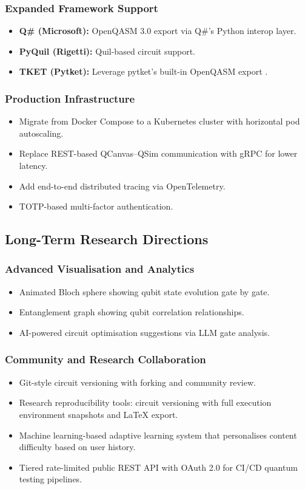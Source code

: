 \subsubsection{Expanded Framework Support}
\begin{itemize}
    \item \textbf{Q\# (Microsoft):} OpenQASM 3.0 export via Q\#'s Python interop layer.
    \item \textbf{PyQuil (Rigetti):} Quil-based circuit support.
    \item \textbf{TKET (Pytket):} Leverage pytket's built-in OpenQASM export \cite{sivarajah2020tket}.
\end{itemize}

\subsubsection{Production Infrastructure}
\begin{itemize}
    \item Migrate from Docker Compose to a Kubernetes cluster with horizontal pod autoscaling.
    \item Replace REST-based QCanvas--QSim communication with gRPC for lower latency.
    \item Add end-to-end distributed tracing via OpenTelemetry.
    \item TOTP-based multi-factor authentication.
\end{itemize}

\subsection{Long-Term Research Directions}

\subsubsection{Advanced Visualisation and Analytics}
\begin{itemize}
    \item Animated Bloch sphere showing qubit state evolution gate by gate.
    \item Entanglement graph showing qubit correlation relationships.
    \item AI-powered circuit optimisation suggestions via LLM gate analysis.
\end{itemize}

\subsubsection{Community and Research Collaboration}
\begin{itemize}
    \item Git-style circuit versioning with forking and community review.
    \item Research reproducibility tools: circuit versioning with full execution environment snapshots and LaTeX export.
    \item Machine learning-based adaptive learning system that personalises content difficulty based on user history.
    \item Tiered rate-limited public REST API with OAuth 2.0 for CI/CD quantum testing pipelines.
\end{itemize}
